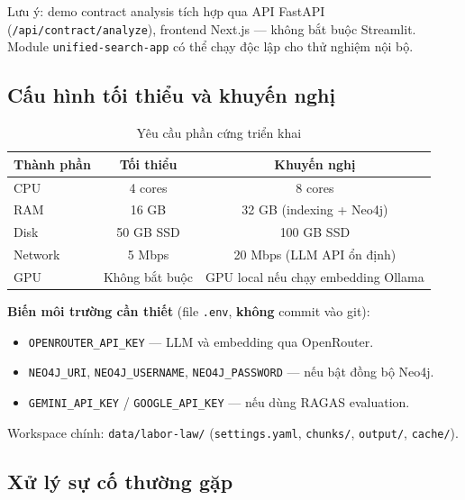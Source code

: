 \documentclass[../DoAn.tex]{subfiles}
\begin{document}
Lưu ý: demo contract analysis tích hợp qua \gls{API} FastAPI (\texttt{/api/contract/analyze}), frontend Next.js --- không bắt buộc Streamlit. Module \texttt{unified-search-app} có thể chạy độc lập cho thử nghiệm nội bộ.

\subsection{Cấu hình tối thiểu và khuyến nghị}
\label{subsection:7.3.2}

\begin{table}[H]
\centering
\caption{Yêu cầu phần cứng triển khai}
\label{table:hardware}
\begin{tabular}{|l|c|c|}
\hline
\textbf{Thành phần} & \textbf{Tối thiểu} & \textbf{Khuyến nghị} \\
\hline
CPU & 4 cores & 8 cores \\
RAM & 16 GB & 32 GB (indexing + Neo4j) \\
Disk & 50 GB SSD & 100 GB SSD \\
Network & 5 Mbps & 20 Mbps (LLM API ổn định) \\
GPU & Không bắt buộc & GPU local nếu chạy embedding Ollama \\
\hline
\end{tabular}
\end{table}

\textbf{Biến môi trường cần thiết} (file \texttt{.env}, \textbf{không} commit vào git):
\begin{itemize}[nosep, leftmargin=*]
    \item \texttt{OPENROUTER\_API\_KEY} --- LLM và embedding qua OpenRouter.
    \item \texttt{NEO4J\_URI}, \texttt{NEO4J\_USERNAME}, \texttt{NEO4J\_PASSWORD} --- nếu bật đồng bộ Neo4j.
    \item \texttt{GEMINI\_API\_KEY} / \texttt{GOOGLE\_API\_KEY} --- nếu dùng RAGAS evaluation.
\end{itemize}

Workspace chính: \texttt{data/labor-law/} (\texttt{settings.yaml}, \texttt{chunks/}, \texttt{output/}, \texttt{cache/}).

\subsection{Xử lý sự cố thường gặp}
\label{subsection:7.3.3}
\end{document}
